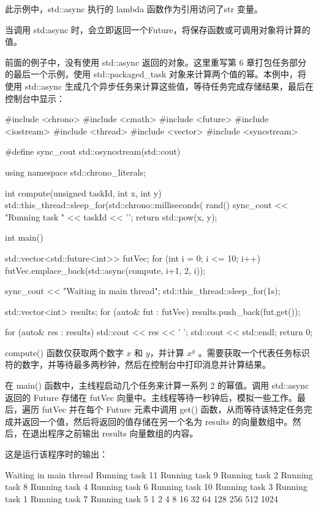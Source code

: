 此示例中，std::async 执行的 lambda 函数作为引用访问了str 变量。


当调用 std:async 时，会立即返回一个Future，将保存函数或可调用对象将计算的值。

前面的例子中，没有使用 std::async 返回的对象。这里重写第 6 章打包任务部分的最后一个示例，使用 std::packaged\_task 对象来计算两个值的幂。本例中，将使用 std::async 生成几个异步任务来计算这些值，等待任务完成存储结果，最后在控制台中显示：

\begin{cpp}
#include <chrono>
#include <cmath>
#include <future>
#include <iostream>
#include <thread>
#include <vector>
#include <syncstream>

#define sync_cout std::osyncstream(std::cout)

using namespace std::chrono_literals;

int compute(unsigned taskId, int x, int y) {
    std::this_thread::sleep_for(std::chrono::milliseconds(
                                rand() %
    sync_cout << "Running task " << taskId << '\n';
    return std::pow(x, y);
}

int main() {
    std::vector<std::future<int>> futVec;
    for (int i = 0; i <= 10; i++)
        futVec.emplace_back(std::async(compute,
                            i+1, 2, i));

    sync_cout << "Waiting in main thread\n";
    std::this_thread::sleep_for(1s);

    std::vector<int> results;
    for (auto& fut : futVec)
        results.push_back(fut.get());

    for (auto& res : results)
        std::cout << res << ' ';
    std::cout << std::endl;
    return 0;
}
\end{cpp}

compute() 函数仅获取两个数字 $x$ 和 $y$，并计算 $x^y$ 。需要获取一个代表任务标识符的数字，并等待最多两秒钟，然后在控制台中打印消息并计算结果。

在 main() 函数中，主线程启动几个任务来计算一系列 2 的幂值。调用 std::async 返回的 Future 存储在 futVec 向量中。主线程等待一秒钟后，模拟一些工作。最后，遍历 futVec 并在每个 Future 元素中调用 get() 函数，从而等待该特定任务完成并返回一个值，然后将返回的值存储在另一个名为 results 的向量数组中。然后，在退出程序之前输出 results 向量数组的内容。

这是运行该程序时的输出：

\begin{shell}
Waiting in main thread
Running task 11
Running task 9
Running task 2
Running task 8
Running task 4
Running task 6
Running task 10
Running task 3
Running task 1
Running task 7
Running task 5
1 2 4 8 16 32 64 128 256 512 1024
\end{shell}

